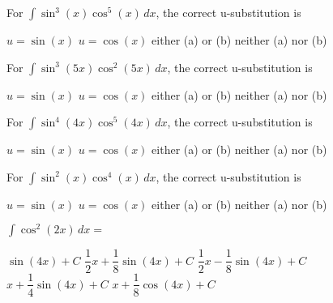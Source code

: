 \begin{questions}
    \question For $\int \sin^3 (x)\cos^5 (x) \, dx$, the correct u-substitution is \\

    \begin{oneparchoices}
        \choice $u = \sin (x)$ 
        \choice $u = \cos (x)$
        \choice either (a) or (b)
        \choice neither (a) nor (b)
    \end{oneparchoices} \par \horizontalline

    \question For $\int \sin^3 (5x)\cos^2 (5x) \, dx$, the correct u-substitution is \\

    \begin{oneparchoices}
        \choice $u = \sin (x)$ 
        \choice $u = \cos (x)$
        \choice either (a) or (b)
        \choice neither (a) nor (b)
    \end{oneparchoices} \par \horizontalline

    \question For $\int \sin^4 (4x)\cos^5 (4x) \, dx$, the correct u-substitution is \\

    \begin{oneparchoices}
        \choice $u = \sin (x)$ 
        \choice $u = \cos (x)$
        \choice either (a) or (b)
        \choice neither (a) nor (b)
    \end{oneparchoices} \par \horizontalline

    \question For $\int \sin^2 (x)\cos^4 (x) \, dx$, the correct u-substitution is \\

    \begin{oneparchoices}
        \choice $u = \sin (x)$ 
        \choice $u = \cos (x)$
        \choice either (a) or (b)
        \choice neither (a) nor (b)
    \end{oneparchoices} \par \horizontalline

    \question $\int \cos^2 (2x) \, dx = $ \\

    \begin{oneparchoices}
        \choice $\sin (4x) + C$
        \choice $\dfrac{1}{2}x + \dfrac{1}{8}\sin (4x) + C$
        \choice $\dfrac{1}{2}x - \dfrac{1}{8}\sin (4x) + C$ \\[11pt]
        \makebox[0.18\textwidth] \choice $x + \dfrac{1}{4}\sin (4x) + C$
        \makebox[0.22\textwidth] \choice $x + \dfrac{1}{8}\cos (4x) + C$
    \end{oneparchoices} \par \horizontalline


\end{questions}
